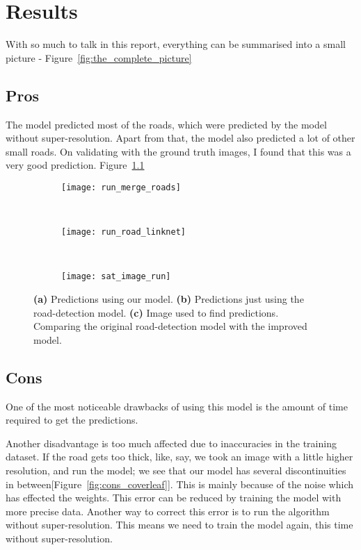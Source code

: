\chapter{Results}\label{chapt:results}

With so much to talk in this report, everything can be summarised into a small picture - Figure~\ref{fig:the_complete_picture}

\section{Pros}
The model predicted most of the roads, which were predicted by the model without super-resolution. Apart from that, the model also predicted a lot of other small roads. On validating with the ground truth images, I found that this was a very good prediction. Figure~\ref{fig:run_merge_road_maps}

\begin{figure}[h!]
  \centering
  \begin{subfigure}{0.55\textwidth}
    \texttt{[image: run\_merge\_roads]}
    \caption{}
  \end{subfigure}~
  \begin{subfigure}{0.21\textwidth}
    \texttt{[image: run\_road\_linknet]}
    \caption{}
  \end{subfigure}~
  \begin{subfigure}{0.21\textwidth}
    \texttt{[image: sat\_image\_run]}
    \caption{}
  \end{subfigure}
  \caption[Predictions]{\textbf{(a)} Predictions using our model. \textbf{(b)} Predictions just using the road-detection model. \textbf{(c)} Image used to find predictions. Comparing the original road-detection model with the improved model.}
  \label{fig:run_merge_road_maps}
\end{figure}


\section{Cons}
One of the most noticeable drawbacks of using this model is the amount of time required to get the predictions. 

Another disadvantage is too much affected due to inaccuracies in the training dataset. If the road gets too thick, like, say, we took an image with a little higher resolution, and run the model; we see that our model has several discontinuities in between[Figure~\ref{fig:cons_coverleaf}]. 
This is mainly because of the noise which has effected the weights. This error can be reduced by training the model with more precise data. Another way to correct this error is to run the algorithm without super-resolution. This means we need to train the model again, this time without super-resolution.

